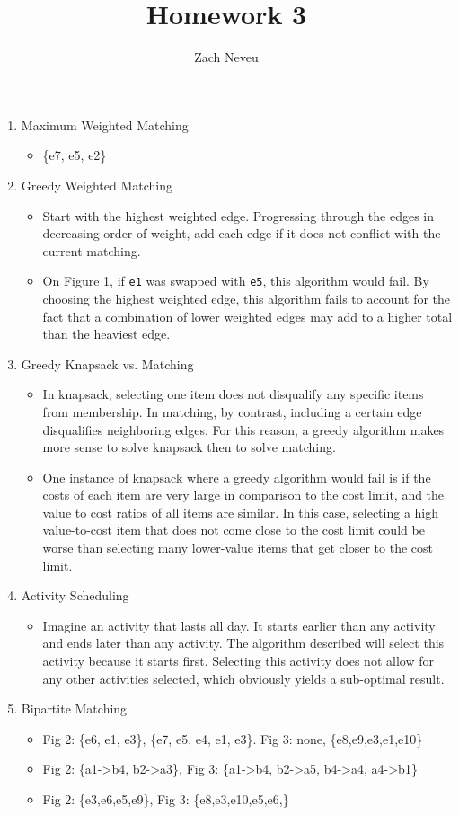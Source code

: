 \documentclass[12pt, letter]{article}
\author{Zach Neveu}
\title{ Homework 3 }
\begin{document}
\maketitle
\begin{enumerate}
	\item Maximum Weighted Matching
	\begin{itemize}
		\item \{e7, e5, e2\}
	\end{itemize}
	\item Greedy Weighted Matching
	\begin{itemize}
		\item Start with the highest weighted edge. Progressing through the edges in decreasing order of weight, add each edge if it does not conflict with the current matching.
		\item On Figure 1, if \texttt{e1} was swapped with \texttt{e5}, this algorithm would fail. By choosing the highest weighted edge, this algorithm fails to account for the fact that a combination of lower weighted edges may add to a higher total than the heaviest edge.
	\end{itemize}
	\item Greedy Knapsack vs. Matching
	\begin{itemize}
		\item In knapsack, selecting one item does not disqualify any specific items from membership. In matching, by contrast, including a certain edge disqualifies neighboring edges. For this reason, a greedy algorithm makes more sense to solve knapsack then to solve matching.
		\item One instance of knapsack where a greedy algorithm would fail is if the costs of each item are very large in comparison to the cost limit, and the value to cost ratios of all items are similar. In this case, selecting a high value-to-cost item that does not come close to the cost limit could be worse than selecting many lower-value items that get closer to the cost limit.
	\end{itemize}
	\item Activity Scheduling
	\begin{itemize}
		\item Imagine an activity that lasts all day. It starts earlier than any activity and ends later than any activity. The algorithm described will select this activity because it starts first. Selecting this activity does not allow for any other activities selected, which obviously yields a sub-optimal result.
	\end{itemize}
	\item Bipartite Matching
	\begin{itemize}
		\item Fig 2: \{e6, e1, e3\}, \{e7, e5, e4, e1, e3\}. Fig 3: none, \{e8,e9,e3,e1,e10\}
		\item Fig 2: \{a1->b4, b2->a3\}, Fig 3: \{a1->b4, b2->a5, b4->a4, a4->b1\}
		\item Fig 2: \{e3,e6,e5,e9\}, Fig 3: \{e8,e3,e10,e5,e6,\}
	\end{itemize}
\end{enumerate}
\end{document}
